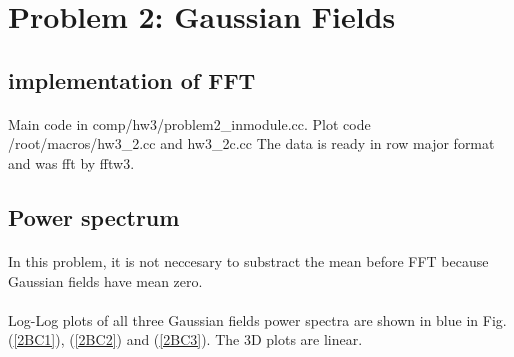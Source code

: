\section{Problem 2: Gaussian Fields}



\subsection{implementation of FFT}
\paragraph{}
Main code in comp/hw3/problem2{\_}inmodule.cc. Plot code  /root/macros/hw3{\_}2.cc and hw3\_2c.cc
The data is ready in row major format and was fft by fftw3.

\subsection{Power spectrum}
\paragraph{}
In this problem, it is not neccesary to substract the mean before FFT because Gaussian fields have mean zero.




\paragraph{}
Log-Log plots of all three Gaussian fields power spectra are shown in blue in Fig. (\ref{2BC1}), (\ref{2BC2}) and (\ref{2BC3}). The 3D plots are linear. 


